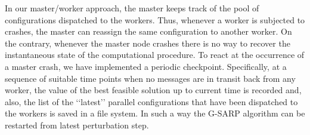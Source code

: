 
In our master/worker approach, the master keeps track of the pool of configurations dispatched to the workers. Thus, whenever a worker is subjected to crashes, the master can reassign the same configuration to another worker. On the contrary, whenever the master node crashes there is no way to recover the instantaneous state of the computational procedure. To react at the occurrence of a master crash, we have implemented a periodic checkpoint. Specifically, at a sequence of suitable time points when no messages are in transit back from any worker, the value of the best feasible solution up to current time is recorded and, also, the list of the ‘‘latest’’ parallel configurations that have been dispatched to the workers is saved in a file system. In such a way the G-SARP algorithm can be restarted from latest perturbation step.











